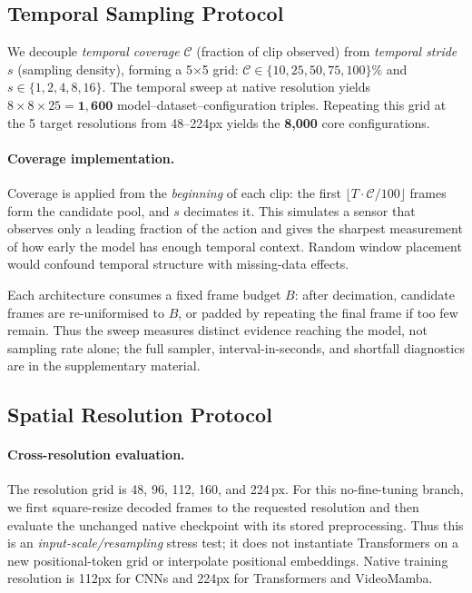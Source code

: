 \documentclass[runningheads]{llncs}
\newcommand{\rev}[1]{\textcolor{revblue}{#1}}
\newcommand{\revdel}[1]{}
\begin{document}
\subsection{Temporal Sampling Protocol}

We decouple \textit{temporal coverage} $\mathcal{C}$ (fraction of clip observed) from \textit{temporal stride} $s$ (sampling density), forming a 5$\times$5 grid: $\mathcal{C}\in\{10,25,50,75,100\}\%$ and $s\in\{1,2,4,8,16\}$. The temporal sweep at native resolution yields $8{\times}8{\times}25{=}\mathbf{1{,}600}$ model--dataset--configuration triples. Repeating this grid at the 5 target resolutions from 48--224px yields the \textbf{8,000} core configurations.

\paragraph{Coverage implementation.}
Coverage is applied from the \emph{beginning} of each clip: the first $\lfloor T\cdot\mathcal{C}/100\rfloor$ frames form the candidate pool, and $s$ \revdel{controls sampling density within that window}\rev{decimates it}. This simulates a sensor that observes only a leading fraction of the action and gives the sharpest measurement of how early the model has enough temporal context. Random window placement would confound temporal structure with missing-data effects.

\rev{Each architecture consumes a fixed frame budget $B$: after decimation, candidate frames are re-uniformised to $B$, or padded by repeating the final frame if too few remain. Thus the sweep measures distinct evidence reaching the model, not sampling rate alone; the full sampler, interval-in-seconds, and shortfall diagnostics are in the supplementary material.}

\subsection{Spatial Resolution Protocol}

\paragraph{Cross-resolution evaluation.}
\rev{The resolution grid is 48, 96, 112, 160, and 224\,px. For this no-fine-tuning branch, we first square-resize decoded frames to the requested resolution and then evaluate the unchanged native checkpoint with its stored preprocessing. Thus this is an \emph{input-scale/resampling} stress test; it does not instantiate Transformers on a new positional-token grid or interpolate positional embeddings. Native training resolution is 112px for CNNs and 224px for Transformers and VideoMamba.}
\end{document}

